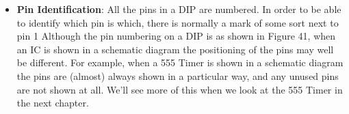 \documentclass{report}
\begin{document}
\begin{itemize}
        \item \textbf{Pin Identification}: All the pins in a DIP are numbered. In order to be able to identify which pin is which, there is normally a mark of some sort next to pin 1
            \bigbreak \noindent 
            \bigbreak \noindent 
            Although the pin numbering on a DIP is as shown in Figure 41, when an IC is shown in a schematic diagram the positioning of the pins may well be different. For example, when a 555 Timer is shown in a schematic diagram the pins are (almost) always shown in a particular way, and any unused pins are not shown at all. We'll see more of this when we look at the 555 Timer in the next chapter.


    \end{itemize}
\end{document}
